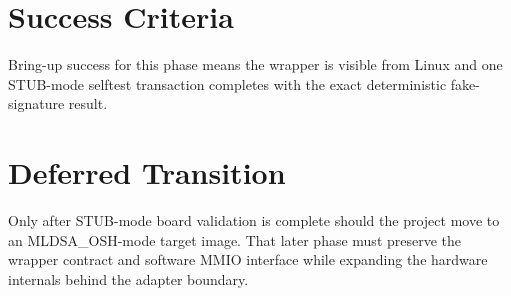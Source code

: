 \section{Success Criteria}
Bring-up success for this phase means the wrapper is visible from Linux and one STUB-mode selftest transaction completes with the exact deterministic fake-signature result.

\section{Deferred Transition}
Only after STUB-mode board validation is complete should the project move to an MLDSA\_OSH-mode target image. That later phase must preserve the wrapper contract and software MMIO interface while expanding the hardware internals behind the adapter boundary.